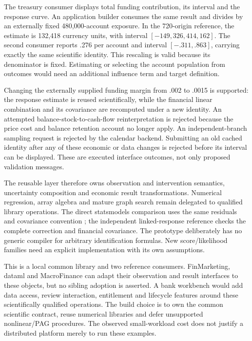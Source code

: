 The treasury consumer displays total funding contribution, its interval
and the response curve. An application builder consumes the same result
and divides by an externally fixed 480,000-account exposure. In the
720-origin reference, the estimate is 132,418 currency units, with interval
$[-149{,}326,414{,}162]$. The second consumer reports .276 per account and
interval $[-.311,.863]$, carrying exactly the same scientific identity.
This rescaling is valid because its denominator is fixed. Estimating or
selecting the account population from outcomes would need an additional
influence term and target definition.

Changing the externally supplied funding margin from .002 to .0015 is
supported: the response estimate is reused scientifically, while the
financial linear combination and its covariance are recomputed under a
new identity. An attempted balance-stock-to-cash-flow reinterpretation is
rejected because the price cost and balance retention account no longer
apply. An independent-branch sampling request is rejected by the calendar
backend. Submitting an old cached identity after any of these economic or
data changes is rejected before its interval can be displayed. These are
executed interface outcomes, not only proposed validation messages.

The reusable layer therefore owns observation and intervention semantics,
uncertainty composition and economic result transformations. Numerical
regression, array algebra and mature graph search remain delegated to
qualified library operations. The direct statsmodels comparison uses the
same residuals and covariance convention \citep{runtime_statsmodels_dynamic};
the independent linked-response reference checks the complete correction
and financial covariance. The prototype deliberately has no generic
compiler for arbitrary identification formulas. New score/likelihood
families need an explicit implementation with its own assumptions.

This is a local common library and two reference consumers. FinMarketing,
dataml and MacroFinance can adapt their observation and result interfaces
to these objects, but no sibling adoption is asserted. A bank workbench
would add data access, review interaction, entitlement and lifecycle
features around these scientifically qualified operations. The build choice
is to own the common scientific contract, reuse numerical libraries and
defer unsupported nonlinear/PAG procedures. The observed small-workload
cost does not justify a distributed platform merely to run these examples.

